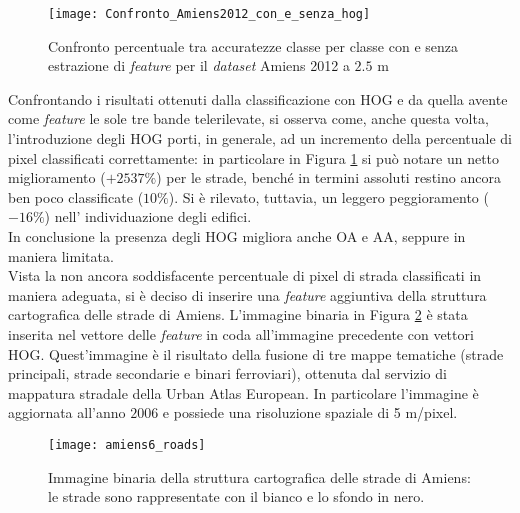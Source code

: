\begin{figure}[!ht]
      \texttt{[image: Confronto\_Amiens2012\_con\_e\_senza\_hog]}
    \caption{Confronto percentuale tra accuratezze classe per classe con e senza estrazione di \emph{feature} per il \emph{dataset} Amiens 2012 a $2.5$ m}
    \label{fig:Confronto_Amiens2012_2.5m}
  \end{figure}

Confrontando i risultati ottenuti dalla classificazione con HOG e da quella avente come \emph{feature} le sole tre bande telerilevate, si osserva come, anche questa volta, l'introduzione degli HOG porti, in generale, ad un incremento della percentuale di pixel classificati correttamente: in particolare in Figura \ref{fig:Confronto_Amiens2012_2.5m} si può notare un netto miglioramento ($+2537\%$) per le strade, benché in termini assoluti restino ancora ben poco classificate ($10\%$). Si è rilevato, tuttavia, un leggero peggioramento ($-16\%$) nell' individuazione degli edifici. \\ In conclusione la presenza degli HOG migliora anche OA e AA, seppure in maniera limitata. \\

Vista la non ancora soddisfacente percentuale di pixel di strada classificati in maniera adeguata, si è deciso di inserire una \emph{feature} aggiuntiva della struttura cartografica delle strade di Amiens. L'immagine binaria in Figura \ref{fig:immagine_roads} è stata inserita nel vettore delle \emph{feature} in coda all'immagine precedente con vettori HOG.
Quest'immagine è il risultato della fusione di tre mappe tematiche (strade principali, strade secondarie e binari ferroviari), ottenuta dal servizio di mappatura stradale della Urban Atlas European. In particolare l'immagine è aggiornata all'anno $2006$ e possiede una risoluzione spaziale di 5 m/pixel.

\begin{figure}[!ht]
\center
\texttt{[image: amiens6\_roads]}
\caption{Immagine binaria della struttura cartografica delle strade di Amiens: le strade sono rappresentate con il  bianco e lo sfondo in nero.}
\label{fig:immagine_roads}
\end{figure}
\


